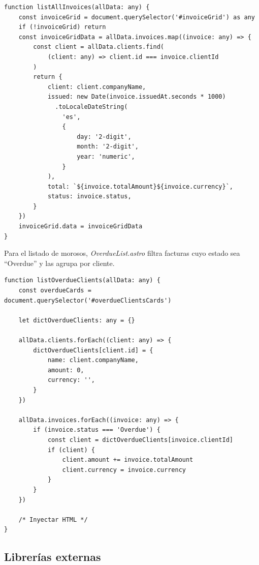\begin{large}
\begin{lstlisting}[language={}, basicstyle=\ttfamily\small, caption={Función para listar todas las facturas en la tabla}]
function listAllInvoices(allData: any) {
    const invoiceGrid = document.querySelector('#invoiceGrid') as any
    if (!invoiceGrid) return
    const invoiceGridData = allData.invoices.map((invoice: any) => {
        const client = allData.clients.find(
            (client: any) => client.id === invoice.clientId
        )
        return {
            client: client.companyName,
            issued: new Date(invoice.issuedAt.seconds * 1000)
              .toLocaleDateString(
                'es',
                {
                    day: '2-digit',
                    month: '2-digit',
                    year: 'numeric',
                }
            ),
            total: `${invoice.totalAmount}${invoice.currency}`,
            status: invoice.status,
        }
    })
    invoiceGrid.data = invoiceGridData
}
\end{lstlisting}

Para el listado de morosos, \textit{OverdueList.astro} filtra facturas cuyo estado sea “Overdue” y las agrupa por cliente.

\begin{lstlisting}[language={}, basicstyle=\ttfamily\small, caption={Función para listar clientes morosos}]
function listOverdueClients(allData: any) {
	const overdueCards = document.querySelector('#overdueClientsCards')

	let dictOverdueClients: any = {}

	allData.clients.forEach((client: any) => {
		dictOverdueClients[client.id] = {
			name: client.companyName,
			amount: 0,
			currency: '',
		}
	})

	allData.invoices.forEach((invoice: any) => {
		if (invoice.status === 'Overdue') {
			const client = dictOverdueClients[invoice.clientId]
			if (client) {
				client.amount += invoice.totalAmount
				client.currency = invoice.currency
			}
		}
	})
	
	/* Inyectar HTML */
}
\end{lstlisting}

\end{large}

\subsection{Librerías externas}

